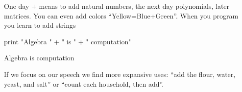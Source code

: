 \newpage


One day  $+$ means to add natural numbers, the next day 
polynomials, later matrices.  
You can even add colors ``Yellow=Blue+Green''. When you program 
you learn to add strings
\begin{center}
\begin{notebookin}
print "Algebra " + " is " + " computation"
\end{notebookin}
\begin{notebookout}
Algebra is computation
\end{notebookout}
\end{center}
If we focus on our 
speech we find more expansive uses:
``add the flour, water, yeast, and salt'' or  
``count each household, then add''.

